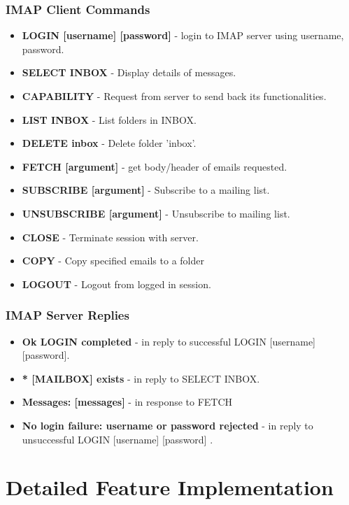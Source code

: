 \documentclass[11pt]{article}
\begin{document}
\begin{multicols}{2}
\subsubsection{IMAP Client Commands}
\begin{itemize}
  \item \textbf{LOGIN [username] [password]} - login to IMAP server using username, password.
  \item \textbf{SELECT INBOX} - Display details of messages.
  \item \textbf{CAPABILITY} - Request from server to send back its functionalities.
  \item \textbf{LIST INBOX} - List folders in INBOX.
  \item \textbf{DELETE inbox} - Delete folder 'inbox'. 
  \item \textbf{FETCH [argument]} - get body/header of emails requested.
  \item \textbf{SUBSCRIBE [argument]} - Subscribe to a mailing list.
  \item \textbf{UNSUBSCRIBE [argument]} - Unsubscribe to mailing list.
  \item \textbf{CLOSE} - Terminate session with server.
  \item \textbf{COPY} - Copy specified emails to a folder
  \item \textbf{LOGOUT} - Logout from logged in session. 
\end{itemize}
\subsubsection{IMAP Server Replies}
\begin{itemize}
  \item \textbf{Ok LOGIN completed} - in reply to successful LOGIN [username] [password].
  \item \textbf{* [MAILBOX] exists} - in reply to SELECT INBOX. 
  \item \textbf{Messages: [messages]} - in response to  FETCH  
  \item \textbf{No login failure: username or password rejected} - in reply to unsuccessful LOGIN [username] [password] \cite{IMAP}. 
\end{itemize}
\section{Detailed Feature Implementation}

\end{multicols}
\end{document}
